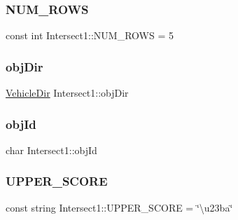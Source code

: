 \subsubsection{\texorpdfstring{N\+U\+M\+\_\+\+R\+O\+WS}{NUM\_ROWS}}
{\footnotesize\ttfamily const int Intersect1\+::\+N\+U\+M\+\_\+\+R\+O\+WS = 5\hspace{0.3cm}{\ttfamily [static]}}

\hypertarget{class_intersect1_ab28ebc72d88ccb28b8be06b5d5899cc8}{}\label{class_intersect1_ab28ebc72d88ccb28b8be06b5d5899cc8} 
\subsubsection{\texorpdfstring{obj\+Dir}{objDir}}
{\footnotesize\ttfamily \hyperlink{vehicle_8h_ab81942edaa6e6c3f12551c3d0e511b85}{Vehicle\+Dir} Intersect1\+::obj\+Dir\hspace{0.3cm}{\ttfamily [private]}}

\hypertarget{class_intersect1_a56c8de0a332b6d6697bd2a90e5b6836c}{}\label{class_intersect1_a56c8de0a332b6d6697bd2a90e5b6836c} 
\subsubsection{\texorpdfstring{obj\+Id}{objId}}
{\footnotesize\ttfamily char Intersect1\+::obj\+Id\hspace{0.3cm}{\ttfamily [private]}}

\hypertarget{class_intersect1_ac17b41141de97da2a83d278a47a8ea30}{}\label{class_intersect1_ac17b41141de97da2a83d278a47a8ea30} 
\subsubsection{\texorpdfstring{U\+P\+P\+E\+R\+\_\+\+S\+C\+O\+RE}{UPPER\_SCORE}}
{\footnotesize\ttfamily const string Intersect1\+::\+U\+P\+P\+E\+R\+\_\+\+S\+C\+O\+RE = \char`\"{}\textbackslash{}u23ba\char`\"{}\hspace{0.3cm}{\ttfamily [static]}}

\hypertarget{class_intersect1_abd5133aa7b6fe6959bfb16282c6fcad9}{}\label{class_intersect1_abd5133aa7b6fe6959bfb16282c6fcad9} 
